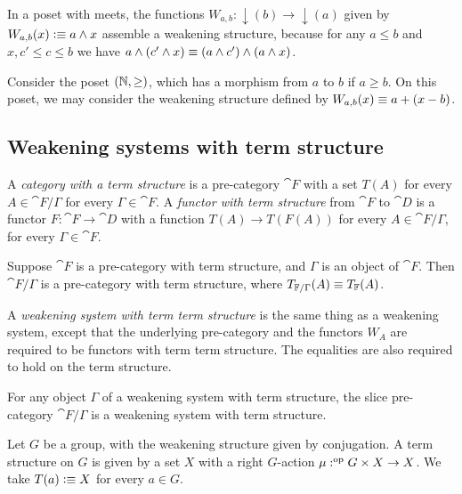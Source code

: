 \begin{eg}
In a poset with meets, the functions $W_{a,b}:{\downarrow}(b)\to{\downarrow}(a)$
given by $W_{a,b}(x)\vcentcolon\equiv a\land x$ assemble a weakening structure, because for
any $a\leq b$ and $x,c'\leq c\leq b$ we have $a\land(c'\land x)\equiv (a\land c')\land
(a\land x)$.  
\end{eg}

\begin{eg}
Consider the poset $(\mathbb{N},\geq)$, which has a morphism from $a$ to $b$ if $a\geq b$.
On this poset, we may consider the weakening structure defined by $W_{a,b}(x)\equiv
a+(x-b)$.
\end{eg}

\subsection{Weakening systems with term structure}
\begin{defn}
A \emph{category with a term structure} is a pre-category $\cat{F}$ with a set $T(A)$ for every
$A\in\cat{F}/\Gamma$ for every $\Gamma\in\cat{F}$. A \emph{functor with term structure} from $\cat{F}$ to $\cat{D}$
is a functor $F:\cat{F}\to\cat{D}$ with a function $T(A)\to T(F(A))$ for
every $A\in\cat{F}/\Gamma$, for every $\Gamma\in\cat{F}$.
\end{defn}

\begin{defn}
Suppose $\cat{F}$ is a pre-category with term structure, and $\Gamma$ is an object of $\cat{F}$. 
Then $\cat{F}/\Gamma$ is a pre-category with term structure, where $T_{\mathbb{F}/\Gamma}(A)\equiv T_\mathbb{F}(A)$.
\end{defn}

\begin{defn}
A \emph{weakening system with term term structure} is the same thing as a weakening system,
except that the underlying pre-category and the functors $W_A$ are required to
be functors with term term structure. The equalities are also required to hold on the term structure.
\end{defn}

\begin{cor}
For any object $\Gamma$ of a weakening system with term structure, the slice pre-category
$\cat{F}/\Gamma$ is a weakening system with term structure.
\end{cor}

\begin{eg}

Let $G$ be a group, with the weakening structure given by conjugation. A term
structure on $G$ is given by a set $X$ with a right $G$-action $\mu:^{\mathrm{op}} G\times X\to X$.
We take $T(a)\vcentcolon\equiv X$ for every $a\in G$.
\end{eg}

